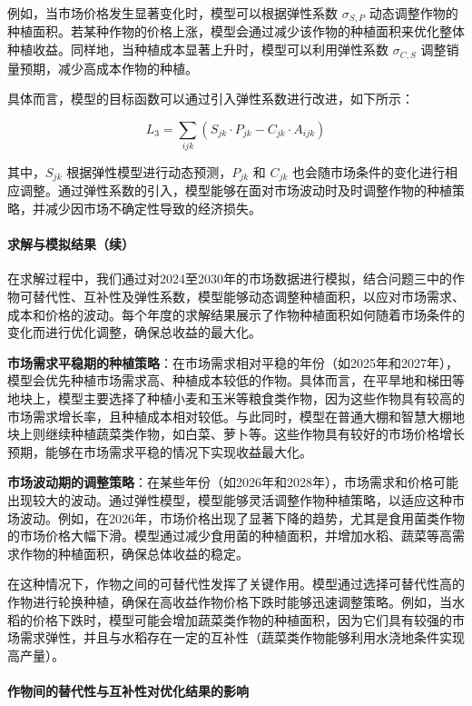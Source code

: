 \documentclass[12pt,a4paper]{nmmcm}
\begin{document}
例如，当市场价格发生显著变化时，模型可以根据弹性系数 $\sigma_{S,P}$ 动态调整作物的种植面积。若某种作物的价格上涨，模型会通过减少该作物的种植面积来优化整体种植收益。同样地，当种植成本显著上升时，模型可以利用弹性系数 $\sigma_{C,S}$ 调整销量预期，减少高成本作物的种植。

具体而言，模型的目标函数可以通过引入弹性系数进行改进，如下所示：

\[
L_3 = \sum_{ijk} \left( S_{jk} \cdot P_{jk} - C_{jk} \cdot A_{ijk} \right)
\]

其中，$S_{jk}$ 根据弹性模型进行动态预测，$P_{jk}$ 和 $C_{jk}$ 也会随市场条件的变化进行相应调整。通过弹性系数的引入，模型能够在面对市场波动时及时调整作物的种植策略，并减少因市场不确定性导致的经济损失。

\paragraph{求解与模拟结果（续）}

在求解过程中，我们通过对2024至2030年的市场数据进行模拟，结合问题三中的作物可替代性、互补性及弹性系数，模型能够动态调整种植面积，以应对市场需求、成本和价格的波动。每个年度的求解结果展示了作物种植面积如何随着市场条件的变化而进行优化调整，确保总收益的最大化。

\textbf{市场需求平稳期的种植策略}：在市场需求相对平稳的年份（如2025年和2027年），模型会优先种植市场需求高、种植成本较低的作物。具体而言，在平旱地和梯田等地块上，模型主要选择了种植小麦和玉米等粮食类作物，因为这些作物具有较高的市场需求增长率，且种植成本相对较低。与此同时，模型在普通大棚和智慧大棚地块上则继续种植蔬菜类作物，如白菜、萝卜等。这些作物具有较好的市场价格增长预期，能够在市场需求平稳的情况下实现收益最大化。

\textbf{市场波动期的调整策略}：在某些年份（如2026年和2028年），市场需求和价格可能出现较大的波动。通过弹性模型，模型能够灵活调整作物种植策略，以适应这种市场波动。例如，在2026年，市场价格出现了显著下降的趋势，尤其是食用菌类作物的市场价格大幅下滑。模型通过减少食用菌的种植面积，并增加水稻、蔬菜等高需求作物的种植面积，确保总体收益的稳定。

在这种情况下，作物之间的可替代性发挥了关键作用。模型通过选择可替代性高的作物进行轮换种植，确保在高收益作物价格下跌时能够迅速调整策略。例如，当水稻的价格下跌时，模型可能会增加蔬菜类作物的种植面积，因为它们具有较强的市场需求弹性，并且与水稻存在一定的互补性（蔬菜类作物能够利用水浇地条件实现高产量）。

\paragraph{作物间的替代性与互补性对优化结果的影响}
\end{document}
